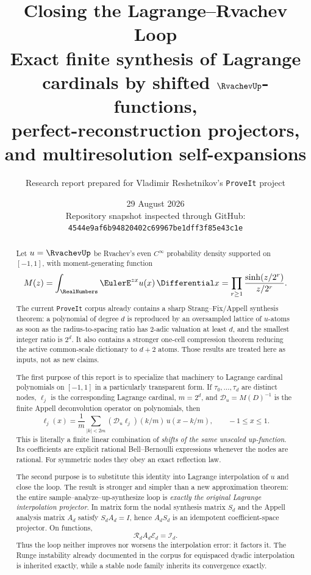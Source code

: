 \documentclass[11pt,oneside]{article}
\title{\bfseries Closing the Lagrange--Rvachev Loop\\[0.4em]
\large Exact finite synthesis of Lagrange cardinals by shifted \(\RvachevUp\)-functions,\\
perfect-reconstruction projectors, and multiresolution self-expansions}
\author{Research report prepared for Vladimir Reshetnikov's \texttt{ProveIt} project}
\date{29 August 2026\\
\small Repository snapshot inspected through GitHub: \texttt{4544e9af6b94820402c69967be1dff3f85e43c1e}}
\numberwithin{equation}{section}
\theoremstyle{definition}
\theoremstyle{remark}
\newcommand{\calD}{\mathscr D_u}
\begin{document}
\maketitle

\begin{abstract}
Let \(u=\RvachevUp\) be Rvachev's even \(C^\infty\) probability density supported on
\([-1,1]\), with moment-generating function
\[
 M(z)=\int_{\RealNumbers}\EulerE^{zx}u(x)\,\Differential x
 =\prod_{r\ge1}\frac{\sinh(z/2^r)}{z/2^r}.
\]
The current \texttt{ProveIt} corpus already contains a sharp Strang--Fix/Appell
synthesis theorem: a polynomial of degree \(d\) is reproduced by an oversampled
lattice of \(u\)-atoms as soon as the radius-to-spacing ratio has \(2\)-adic
valuation at least \(d\), and the smallest integer ratio is \(2^d\).  It also
contains a stronger one-cell compression theorem reducing the active common-scale
dictionary to \(d+2\) atoms.  Those results are treated here as inputs, not as new
claims.

The first purpose of this report is to specialize that machinery to Lagrange
cardinal polynomials on \([-1,1]\) in a particularly transparent form.  If
\(\tau_0,\ldots,\tau_d\) are distinct nodes, \(\ell_j\) is the corresponding
Lagrange cardinal, \(m=2^d\), and
\(\calD=M(D)^{-1}\) is the finite Appell deconvolution operator on polynomials,
then
\[
 \boxed{
 \ell_j(x)=\frac1m\sum_{|k|<2m}
 (\calD\ell_j)(k/m)\,u(x-k/m),\qquad -1\le x\le1.}
\]
This is literally a finite linear combination of \emph{shifts of the same
unscaled up-function}.  Its coefficients are explicit rational Bell--Bernoulli
expressions whenever the nodes are rational.  For symmetric nodes they obey an
exact reflection law.

The second purpose is to substitute this identity into Lagrange interpolation of
\(u\) and close the loop.  The result is stronger and simpler than a new
approximation theorem: the entire sample--analyze--up-synthesize loop is
\emph{exactly the original Lagrange interpolation projector}.  In matrix form the
nodal synthesis matrix \(S_d\) and the Appell analysis matrix \(A_d\) satisfy
\(S_dA_d=I\), hence \(A_dS_d\) is an idempotent coefficient-space projector.  On
functions,
\[
 \mathcal R_dA_d\mathcal E_d=\mathcal I_d.
\]
Thus the loop neither improves nor worsens the interpolation error: it factors it.
The Runge instability already documented in the corpus for equispaced dyadic
interpolation is inherited exactly, while a stable node family inherits its
convergence exactly.


\end{abstract}
\end{document}

